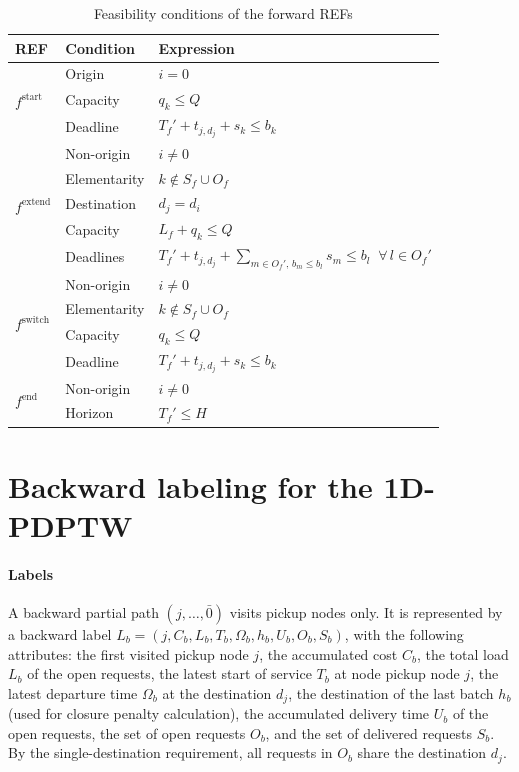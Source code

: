 \documentclass[preprint,11pt,authoryear]{elsarticle}
\begin{document}
\begin{table}[!ht]
\caption{Feasibility conditions of the forward REFs}
\label{tab:forward-feasibility}
\footnotesize
\renewcommand{\arraystretch}{1.5}
\setlength{\tabcolsep}{6pt}
\begin{tabularx}{\linewidth}{@{}l l X@{}}
\toprule
REF & Condition & Expression \\
\midrule

\multirow{3}{*}{$f^{\mathrm{start}}$}
& Origin & $i = 0$ \\
& Capacity & $q_k \leq Q$ \\
& Deadline & $T_f' + t_{j,d_j} + s_k \leq b_k$ \\
\midrule

\multirow{5}{*}{$f^{\mathrm{extend}}$}
& Non-origin & $i \neq 0$ \\
& Elementarity & $k \notin S_f \cup O_f$ \\
& Destination & $d_j = d_i$ \\
& Capacity & $L_f + q_k \leq Q$ \\
& Deadlines & $T_f' + t_{j,d_j} + \displaystyle\sum_{m \in O_f',\, b_m \leq b_l} s_m \leq b_l \;\; \forall\, l \in O_f'$ \\
\midrule

\multirow{4}{*}{$f^{\mathrm{switch}}$ }
& Non-origin & $i \neq 0$ \\
& Elementarity & $k \notin S_f \cup O_f$ \\
& Capacity & $q_k \leq Q$ \\
& Deadline & $T_f' + t_{j,d_j} + s_k \leq b_k$ \\
\midrule

\multirow{2}{*}{$f^{\mathrm{end}}$}
& Non-origin & $i \neq 0$ \\
& Horizon & $T_f' \leq H$ \\

\bottomrule
\end{tabularx}
\end{table}




\newpage

\section{Backward labeling for the 1D-PDPTW}
\label{sec:backward-labeling}

\paragraph{Labels}
A backward partial path $(j, \ldots, \bar 0)$ visits pickup nodes only. It is represented by a
backward label $L_b = (j, C_b, L_b, T_b, \Omega_b, h_b, U_b, O_b, S_b)$, with the following attributes: 
the first visited pickup node $j$, 
the accumulated cost $C_b$, 
the total load $L_b$ of the open requests, 
the latest start of service $T_b$ at node pickup node $j$, 
the latest departure time $\Omega_b$ at the destination $d_j$,
the destination of the last batch $h_b$ (used for closure penalty calculation), 
the accumulated delivery time $U_b$ of the open requests, 
the set of open requests $O_b$, and 
the set of delivered requests $S_b$. 
By the single-destination requirement, all requests in $O_b$ share the destination $d_j$.
\end{document}
